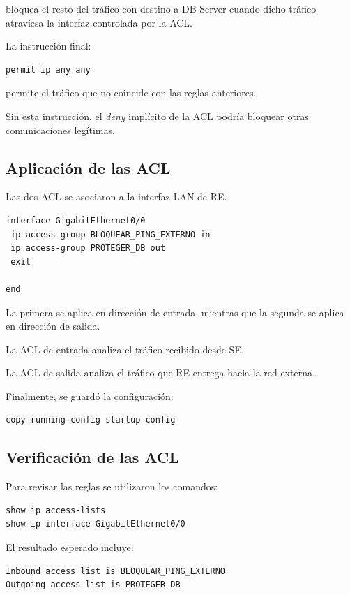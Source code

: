 \documentclass[12pt,a4paper]{article}
\begin{document}
bloquea el resto del tráfico
con destino a DB Server
cuando dicho tráfico
atraviesa la interfaz
controlada por la ACL.

La instrucción final:

\begin{lstlisting}
permit ip any any
\end{lstlisting}

permite el tráfico que no
coincide con las reglas anteriores.

Sin esta instrucción,
el \textit{deny} implícito
de la ACL podría bloquear
otras comunicaciones legítimas.

\subsection{Aplicación de las ACL}

Las dos ACL se asociaron
a la interfaz LAN de RE.

\begin{lstlisting}
interface GigabitEthernet0/0
 ip access-group BLOQUEAR_PING_EXTERNO in
 ip access-group PROTEGER_DB out
 exit

end
\end{lstlisting}

La primera se aplica
en dirección de entrada,
mientras que la segunda
se aplica en dirección
de salida.

La ACL de entrada analiza
el tráfico recibido desde SE.

La ACL de salida analiza
el tráfico que RE entrega
hacia la red externa.

Finalmente, se guardó
la configuración:

\begin{lstlisting}
copy running-config startup-config
\end{lstlisting}

\subsection{Verificación de las ACL}

Para revisar las reglas
se utilizaron los comandos:

\begin{lstlisting}
show ip access-lists
show ip interface GigabitEthernet0/0
\end{lstlisting}

El resultado esperado incluye:

\begin{lstlisting}
Inbound access list is BLOQUEAR_PING_EXTERNO
Outgoing access list is PROTEGER_DB
\end{lstlisting}
\end{document}
